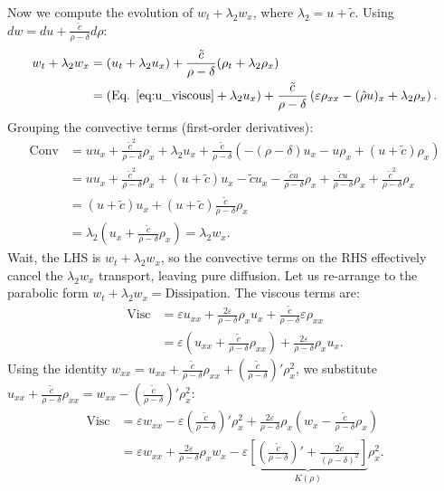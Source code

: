 \documentclass[12pt, reqno]{article}
\theoremstyle{definition}
\numberwithin{equation}{section}
\begin{document}
Now we compute the evolution of $w_t + \lambda_2 w_x$, where $\lambda_2 = u + \tilde{c}$. Using $dw = du + \frac{\tilde{c}}{\rho-\delta} d\rho$:
\begin{align*}
    w_t + \lambda_2 w_x &= (u_t + \lambda_2 u_x) + \frac{\tilde{c}}{\rho-\delta}(\rho_t + \lambda_2 \rho_x) \\
    &= \left( \text{Eq. \ref{eq:u_viscous}} + \lambda_2 u_x \right) + \frac{\tilde{c}}{\rho-\delta} \left( \varepsilon\rho_{xx} - (\hat{\rho} u)_x + \lambda_2\rho_x \right).
\end{align*}
Grouping the convective terms (first-order derivatives):
\begin{align*}
    \text{Conv} &= u u_x + \frac{\tilde{c}^2}{\rho-\delta}\rho_x + \lambda_2 u_x + \frac{\tilde{c}}{\rho-\delta} \left( -(\rho-\delta)u_x - u \rho_x + (u+\tilde{c})\rho_x \right) \\
    &= u u_x + \frac{\tilde{c}^2}{\rho-\delta}\rho_x + (u+\tilde{c})u_x - \tilde{c} u_x - \frac{\tilde{c} u}{\rho-\delta}\rho_x + \frac{\tilde{c} u}{\rho-\delta}\rho_x + \frac{\tilde{c}^2}{\rho-\delta}\rho_x \\
    &= (u+\tilde{c})u_x + (u+\tilde{c}) \frac{\tilde{c}}{\rho-\delta}\rho_x \\
    &= \lambda_2 \left( u_x + \frac{\tilde{c}}{\rho-\delta}\rho_x \right) = \lambda_2 w_x.
\end{align*}
Wait, the LHS is $w_t + \lambda_2 w_x$, so the convective terms on the RHS effectively cancel the $\lambda_2 w_x$ transport, leaving pure diffusion. Let us re-arrange to the parabolic form $w_t + \lambda_2 w_x = \text{Dissipation}$.
The viscous terms are:
\begin{align*}
    \text{Visc} &= \varepsilon u_{xx} + \frac{2\varepsilon}{\rho-\delta}\rho_x u_x + \frac{\tilde{c}}{\rho-\delta}\varepsilon \rho_{xx} \\
    &= \varepsilon \left( u_{xx} + \frac{\tilde{c}}{\rho-\delta}\rho_{xx} \right) + \frac{2\varepsilon}{\rho-\delta}\rho_x u_x.
\end{align*}
Using the identity $w_{xx} = u_{xx} + \frac{\tilde{c}}{\rho-\delta}\rho_{xx} + \left(\frac{\tilde{c}}{\rho-\delta}\right)' \rho_x^2$, we substitute $u_{xx} + \frac{\tilde{c}}{\rho-\delta}\rho_{xx} = w_{xx} - \left(\frac{\tilde{c}}{\rho-\delta}\right)' \rho_x^2$:
\begin{align*}
    \text{Visc} &= \varepsilon w_{xx} - \varepsilon \left(\frac{\tilde{c}}{\rho-\delta}\right)' \rho_x^2 + \frac{2\varepsilon}{\rho-\delta}\rho_x \left( w_x - \frac{\tilde{c}}{\rho-\delta}\rho_x \right) \\
    &= \varepsilon w_{xx} + \frac{2\varepsilon}{\rho-\delta}\rho_x w_x - \varepsilon \underbrace{\left[ \left( \frac{\tilde{c}}{\rho-\delta} \right)' + \frac{2\tilde{c}}{(\rho-\delta)^2} \right]}_{K(\rho)} \rho_x^2.
\end{align*}
\end{document}
